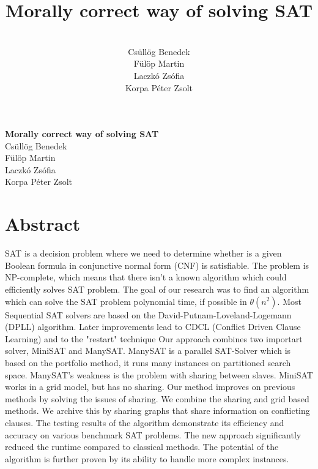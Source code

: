 \documentclass{article}
\begin{document}
\begin{titlepage}
    \centering
    \vspace{.7\baselineskip}
    {\huge \textbf{Morally correct way of solving SAT}}
    \\[10em]
      Csüllög Benedek
    \\Fülöp Martin
    \\Laczkó Zsófia
    \\Korpa Péter Zsolt\\
\end{titlepage}


\title{Morally correct way of solving SAT}
\author{
  \\Csüllög Benedek
  \\Fülöp Martin
  \\Laczkó Zsófia
  \\Korpa Péter Zsolt\\
}
\maketitle

\section*{Abstract}
\label{sec:abstract}

SAT is a decision problem where we need to determine whether is a given Boolean formula in conjunctive normal form (CNF) is satisfiable. The problem is NP-complete, which means that there isn’t a known algorithm which could efficiently solves SAT problem. 
The goal of our research was to find an algorithm which can solve the SAT problem polynomial time, if possible in $\theta(n^2)$.
Most Sequential SAT solvers are based on the David-Putnam-Loveland-Logemann (DPLL) algorithm. Later improvements lead to CDCL (Conflict Driven Clause Learning) and to the "restart" technique Our approach combines two importart solver, MiniSAT and ManySAT. 
ManySAT is a parallel SAT-Solver which is based on the portfolio method, it runs many instances on partitioned search space. ManySAT's weakness is the problem with sharing between slaves. MiniSAT works in a grid model, but has no sharing. Our method improves on previous methods by solving the issues of sharing. We combine the sharing and grid based methods. We archive this by sharing graphs that share information on conflicting clauses. The testing results of the algorithm demonstrate its efficiency and accuracy on various benchmark SAT problems. The new approach significantly reduced the runtime compared to classical methods. The potential of the algorithm is further proven by its ability to handle more complex instances.
\end{document}
